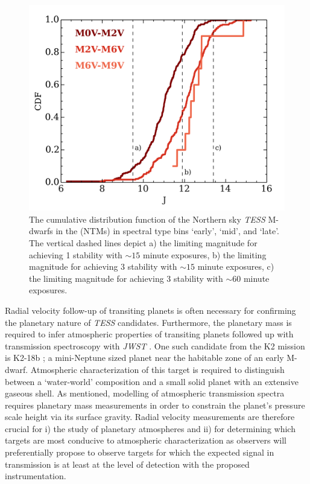 \begin{figure}
\centering
\includegraphics[scale=.5]{figures/tessjmag_sample.png}
\caption{The cumulative distribution function of the Northern sky \emph{TESS} M-dwarfs in 
the (NTMs) in spectral type bins `early', `mid', and `late'. The vertical dashed 
lines depict a) the limiting magnitude for achieving 1 \mps{} stability with $\sim 15$ 
minute exposures,  b) the limiting magnitude for achieving 3 \mps{} stability with 
$\sim 15$ minute exposures, c) the limiting magnitude for achieving 3 \mps{} stability 
with $\sim 60$ minute exposures. \label{fig:tessmdwarfs}}
\end{figure}

Radial velocity follow-up of transiting planets 
is often necessary for confirming the planetary nature of 
\emph{TESS} candidates. Furthermore, the planetary mass is required to infer 
atmospheric properties of transiting planets followed up with transmission 
spectroscopy with \emph{JWST} \parencite{beichman14}. 
One such candidate 
from the K2 mission is K2-18b \parencite{montet15}; a mini-Neptune sized planet 
near the habitable zone of an early M-dwarf. Atmospheric characterization of 
this target is required to distinguish between a `water-world' composition and 
a small solid planet with an extensive gaseous shell. As mentioned, 
modelling of atmospheric 
transmission spectra requires planetary mass measurements in order to constrain the 
planet's pressure scale height via its surface gravity. Radial velocity 
measurements are therefore crucial for i) the study of planetary atmospheres and 
ii) for determining which targets are most conducive to atmospheric 
characterization as observers will preferentially propose to observe targets 
for which the expected signal in transmission is at least at the level of 
detection with the proposed instrumentation.


